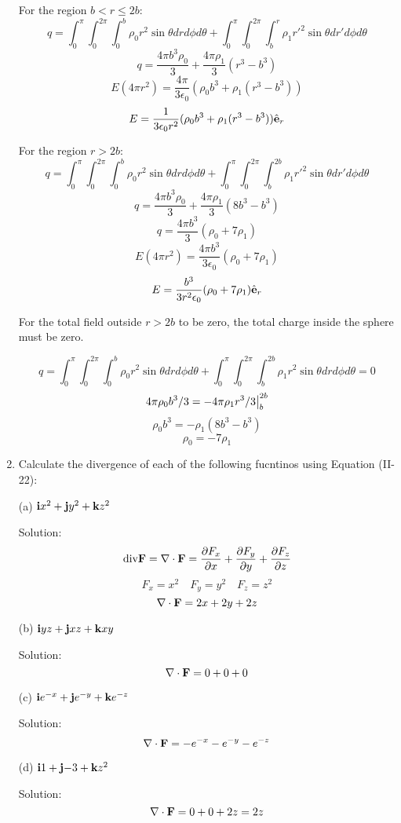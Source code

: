 \documentclass{article}
\begin{document}
\begin{enumerate}
    For the region $b < r \leq 2b$:
    \[ q = \int_0^{\pi} \int_0^{2\pi} \int_0^b \rho_0 r^2 \sin{\theta} dr d\phi d\theta +
        \int_0^{\pi} \int_0^{2\pi} \int_b^r \rho_1 r'^2 \sin{\theta} dr' d\phi d\theta \]
    \[ q = \frac{4\pi b^3 \rho_0}{3} + \frac{4\pi \rho_1}{3} (r^3 - b^3) \]
    \[ E (4 \pi r^2) = \frac{4\pi}{3\epsilon_0}(\rho_0 b^3 + \rho_1(r^3 - b^3)) \]
    \[ E = \frac{1}{3\epsilon_0 r^2} (\rho_0 b^3 + \rho_1(r^3 - b^3)) \hat{\textbf{e}}_r \]

    For the region $r > 2b$:
    \[ q = \int_0^{\pi} \int_0^{2\pi} \int_0^b \rho_0 r^2 \sin{\theta} dr d\phi d\theta +
        \int_0^{\pi} \int_0^{2\pi} \int_b^{2b} \rho_1 r'^2 \sin{\theta} dr' d\phi d\theta \]
    \[ q = \frac{4\pi b^3 \rho_0}{3} + \frac{4\pi \rho_1}{3} (8b^3 - b^3) \]
    \[ q = \frac{4\pi b^3}{3}(\rho_0 + 7\rho_1) \]
    \[ E (4 \pi r^2) = \frac{4\pi b^3}{3 \epsilon_0}(\rho_0 + 7\rho_1) \]
    \[ E = \frac{b^3}{3 r^2 \epsilon_0}(\rho_0 + 7\rho_1) \hat{\textbf{e}}_r \]

    For the total field outside $r > 2b$ to be zero, the total charge inside the sphere must be zero.

    \[ q = \int_0^{\pi} \int_0^{2\pi} \int_0^b \rho_0 r^2 \sin{\theta} dr d\phi d\theta +
        \int_0^{\pi} \int_0^{2\pi} \int_b^{2b} \rho_1 r^2 \sin{\theta} dr d\phi d\theta = 0 \]
    \[ 4\pi \rho_0 b^3 / 3 = - 4\pi \rho_1 r^3 / 3 \big{|}_b^{2b} \]
    \[ \rho_0 b^3 = - \rho_1 (8b^3 - b^3) \]
    \[ \rho_0 = - 7\rho_1 \]

    \item Calculate the divergence of each of the following fucntinos using Equation (II-22):

    (a) $\textbf{i}{x^2} + \textbf{j}{y^2} + \textbf{k}{z^2}$

    Solution:
    \[ \textnormal{div} \textbf{F} = \nabla \cdot \textbf{F} = \frac{\partial{F_x}}{\partial{x}} + \frac{\partial{F_y}}{\partial{y}} + \frac{\partial{F_z}}{\partial{z}} \]
    \[ F_x = x^2 \quad F_y = y^2 \quad F_z = z^2 \]
    \[ \nabla \cdot \textbf{F} = 2x + 2y + 2z \]

    (b) $\textbf{i}{yz} + \textbf{j}{xz} + \textbf{k}{xy}$

    Solution:
    \[ \nabla \cdot \textbf{F} = 0 + 0 + 0 \]

    (c) $\textbf{i}{e^{-x}} + \textbf{j}{e^{-y}} + \textbf{k}{e^{-z}}$

    Solution:
    \[ \nabla \cdot \textbf{F} = -e^{-x} - e^{-y} - e^{-z} \]

    (d) $\textbf{i}{1} + \textbf{j}{-3} + \textbf{k}{z^2}$

    Solution:
    \[ \nabla \cdot \textbf{F} = 0 + 0 + 2z = 2z \]


\end{enumerate}
\end{document}
